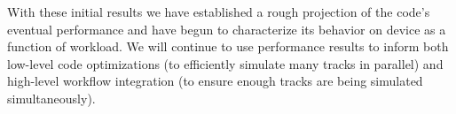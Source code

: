 With these initial results we have established a rough projection of the code's
eventual performance and have begun to characterize its behavior on device as a
function of workload. We will continue to use performance results to inform both
low-level code optimizations (to efficiently simulate many tracks in parallel)
and high-level workflow integration (to ensure enough tracks are being simulated
simultaneously).
